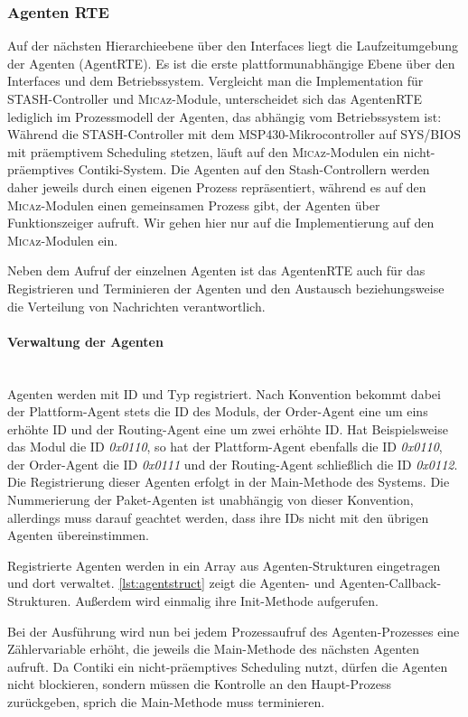 \subsubsection{Agenten RTE}
Auf der nächsten Hierarchieebene über den Interfaces liegt die Laufzeitumgebung der Agenten (AgentRTE). Es ist die erste plattformunabhängige Ebene über den Interfaces und dem Betriebssystem. Vergleicht man die Implementation für STASH-Controller und \textsc{Mica}z-Module, unterscheidet sich das AgentenRTE lediglich im Prozessmodell der Agenten, das abhängig vom Betriebssystem ist: Während die STASH-Controller mit dem MSP430-Mikrocontroller auf SYS/BIOS mit präemptivem Scheduling stetzen, läuft auf den \textsc{Mica}z-Modulen ein nicht-präemptives Contiki-System. Die Agenten auf den Stash-Controllern werden daher jeweils durch einen eigenen Prozess repräsentiert, während es auf den \textsc{Mica}z-Modulen einen gemeinsamen Prozess gibt, der Agenten über Funktionszeiger aufruft. Wir gehen hier nur auf die Implementierung auf den \textsc{Mica}z-Modulen ein.

Neben dem Aufruf der einzelnen Agenten ist das AgentenRTE auch für das Registrieren und Terminieren der Agenten und den Austausch beziehungsweise die Verteilung von Nachrichten verantwortlich.

\paragraph{Verwaltung der Agenten}\mbox{}\\
Agenten werden mit ID und Typ registriert. Nach Konvention bekommt dabei der Plattform-Agent stets die ID des Moduls, der Order-Agent eine um eins erhöhte ID und der Routing-Agent eine um zwei erhöhte ID. Hat Beispielsweise das Modul die ID \textit{0x0110}, so hat der Plattform-Agent ebenfalls die ID \textit{0x0110}, der Order-Agent die ID \textit{0x0111} und der Routing-Agent schließlich die ID \textit{0x0112}. Die Registrierung dieser Agenten erfolgt in der Main-Methode des Systems. Die Nummerierung der Paket-Agenten ist unabhängig von dieser Konvention, allerdings muss darauf geachtet werden, dass ihre IDs nicht mit den übrigen Agenten übereinstimmen.

Registrierte Agenten werden in ein Array aus Agenten-Strukturen eingetragen und dort verwaltet.
\autoref{lst:agentstruct} zeigt die Agenten- und Agenten-Callback-Strukturen. Außerdem wird einmalig ihre Init-Methode aufgerufen.

Bei der Ausführung wird nun bei jedem Prozessaufruf des Agenten-Prozesses eine Zählervariable erhöht, die jeweils die Main-Methode des nächsten Agenten aufruft. Da  Contiki ein nicht-präemptives Scheduling nutzt, dürfen die Agenten nicht blockieren, sondern müssen die Kontrolle an den Haupt-Prozess zurückgeben, sprich die Main-Methode muss terminieren.

